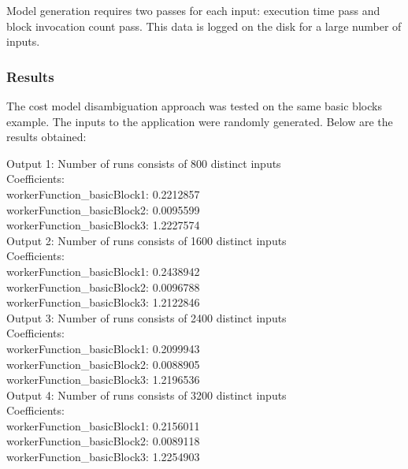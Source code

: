 Model generation requires two passes for each input: execution time pass and block invocation count pass. This data is logged on the disk for a large number of inputs.\newline 

\subsubsection{Results}

The cost model disambiguation approach was tested on the same basic blocks example. The inputs to the application were randomly generated. Below are the results obtained:

Output 1: Number of runs consists of 800 distinct inputs\\

Coefficients:\\

workerFunction\_basicBlock1: 0.2212857\\
workerFunction\_basicBlock2: 0.0095599\\
workerFunction\_basicBlock3: 1.2227574\\

Output 2: Number of runs consists of 1600 distinct inputs\\

Coefficients:\\

workerFunction\_basicBlock1: 0.2438942\\
workerFunction\_basicBlock2: 0.0096788\\
workerFunction\_basicBlock3: 1.2122846\\


Output 3: Number of runs consists of 2400 distinct inputs\\

Coefficients:\\

workerFunction\_basicBlock1: 0.2099943\\
workerFunction\_basicBlock2: 0.0088905\\
workerFunction\_basicBlock3: 1.2196536\\

Output 4: Number of runs consists of 3200 distinct inputs\\

Coefficients:\\

workerFunction\_basicBlock1: 0.2156011\\
workerFunction\_basicBlock2: 0.0089118\\
workerFunction\_basicBlock3: 1.2254903\\


